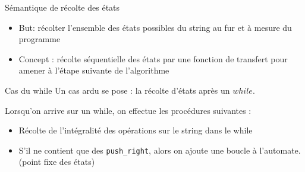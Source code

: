 \documentclass{beamer}
\begin{document}
\begin{frame}{Sémantique de récolte des états}
  \begin{itemize}
  \item But: récolter l'ensemble des états possibles du string au fur et à mesure du programme
  \item Concept : récolte séquentielle des états par une fonction de transfert pour amener à l'étape suivante de l'algorithme
  \end{itemize}

\end{frame}

\begin{frame}{Cas du while}
  Un cas ardu se pose : la récolte d'états après un $while$.

  Lorsqu'on arrive sur un while, on effectue les procédures suivantes :
  \begin{itemize}
    \item Récolte de l'intégralité des opérations sur le string dans le while
    \item S'il ne contient que des \texttt{push\_right}, alors on ajoute une boucle à l'automate. (point fixe des états)
  \end{itemize}
\end{frame}
\end{document}
